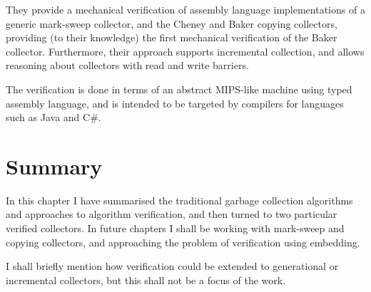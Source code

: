 They provide a mechanical verification of assembly language
implementations of a generic mark-sweep collector, and the Cheney and
Baker copying collectors, providing (to their knowledge) the first
mechanical verification of the Baker collector. Furthermore, their
approach supports incremental collection, and allows reasoning about
collectors with read and write barriers.

The verification is done in terms of an abstract MIPS-like machine
using typed assembly language, and is intended to be targeted by
compilers for languages such as Java and C\#.

\section{Summary}
\label{sec:lit-summary}

In this chapter I have summarised the traditional \gls{garbage collection}
algorithms and approaches to \gls{algorithm verification}, and then turned
to two particular verified \glspl{collector}. In future chapters I shall be
working with \gls{mark-sweep} and \gls{copying} \glspl{collector}, and
approaching the problem of verification using embedding.

I shall briefly mention how verification could be extended to
generational or incremental collectors, but this shall not be a focus
of the work.
